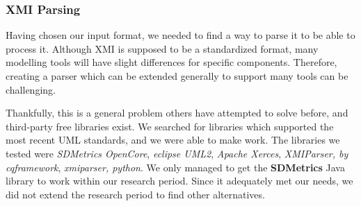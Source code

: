 \documentclass[11pt]{article}
\begin{document}
    \subsubsection{XMI Parsing}\label{subsubsec:parsing}
    Having chosen our input format, we needed to find a way to parse it to be able to process it.
    Although XMI is supposed to be a standardized format,
    many modelling tools will have slight differences for specific components.
    Therefore, creating a parser which can be extended generally to support many tools can be challenging.

    Thankfully, this is a general problem others have attempted to solve before, and third-party free libraries exist.
    We searched for libraries which supported the most recent UML standards, and we were able to make work.
    The libraries we tested were \textit{SDMetrics OpenCore},
    \textit{eclipse UML2}, \textit{Apache Xerces}, \textit{XMIParser, by cqframework}, \textit{xmiparser, python}.
    We only managed to get the \textbf{SDMetrics} Java library to work within our research period.
    Since it adequately met our needs, we did not extend the research period to find other alternatives.
\end{document}
